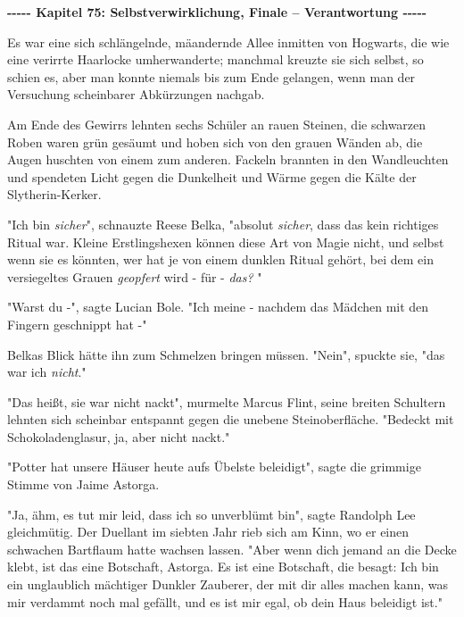 

\hypertarget{selbstverwirklichung-finale-verantwortung}{%

\textbf{-\/-\/-\/-\/- Kapitel 75: Selbstverwirklichung, Finale -- Verantwortung \textbf{-\/-\/-\/-\/-}}

Es war eine sich schlängelnde, mäandernde Allee inmitten von Hogwarts, die wie eine verirrte Haarlocke umherwanderte; manchmal kreuzte sie sich selbst, so schien es, aber man konnte niemals bis zum Ende gelangen, wenn man der Versuchung scheinbarer Abkürzungen nachgab.

Am Ende des Gewirrs lehnten sechs Schüler an rauen Steinen, die schwarzen Roben waren grün gesäumt und hoben sich von den grauen Wänden ab, die Augen huschten von einem zum anderen. Fackeln brannten in den Wandleuchten und spendeten Licht gegen die Dunkelheit und Wärme gegen die Kälte der Slytherin-Kerker.

"Ich bin \emph{sicher}", schnauzte Reese Belka, "absolut \emph{sicher}, dass das kein richtiges Ritual war. Kleine Erstlingshexen können diese Art von Magie nicht, und selbst wenn sie es könnten, wer hat je von einem dunklen Ritual gehört, bei dem ein versiegeltes Grauen \emph{geopfert} wird - für - \emph{das?} "

"Warst du -", sagte Lucian Bole. "Ich meine - nachdem das Mädchen mit den Fingern geschnippt hat -"

Belkas Blick hätte ihn zum Schmelzen bringen müssen. "Nein", spuckte sie, "das war ich \emph{nicht}."

"Das heißt, sie war nicht nackt", murmelte Marcus Flint, seine breiten Schultern lehnten sich scheinbar entspannt gegen die unebene Steinoberfläche. "Bedeckt mit Schokoladenglasur, ja, aber nicht nackt."

"Potter hat unsere Häuser heute aufs Übelste beleidigt", sagte die grimmige Stimme von Jaime Astorga.

"Ja, ähm, es tut mir leid, dass ich so unverblümt bin", sagte Randolph Lee gleichmütig. Der Duellant im siebten Jahr rieb sich am Kinn, wo er einen schwachen Bartflaum hatte wachsen lassen. "Aber wenn dich jemand an die Decke klebt, ist das eine Botschaft, Astorga. Es ist eine Botschaft, die besagt: Ich bin ein unglaublich mächtiger Dunkler Zauberer, der mit dir alles machen kann, was mir verdammt noch mal gefällt, und es ist mir egal, ob dein Haus beleidigt ist."

}
